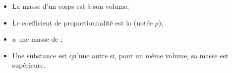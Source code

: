 \begin{mybilan}
	\begin{itemize}
		\item La masse d'un corps est  à son volume; 
		\item Le coefficient de proportionnalité est la  (notée $\rho$);
		\item {} a une masse de ;
		\item Une substance est  qu'une autre si, pour un même volume, sa masse est supérieure.		
	\end{itemize}
\end{mybilan}